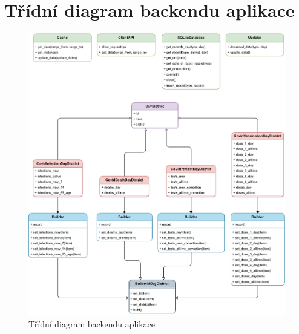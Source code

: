 \chapter{Třídní diagram backendu aplikace}

\begin{figure}[h]
	\centering
	\includegraphics[width=1\textwidth]{Pictures/diagram4.pdf}
	\caption{Třídní diagram backendu aplikace}
	\label{fig:Diagram4}
\end{figure}

\endinput